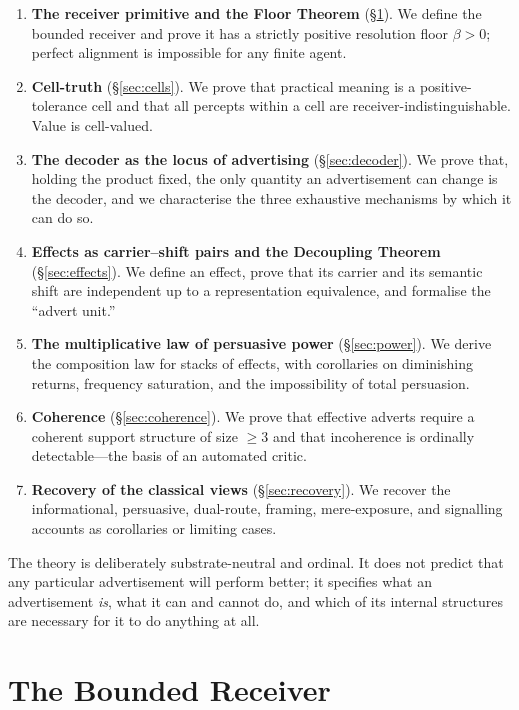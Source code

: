 \documentclass[twocolumn,11pt,a4paper]{article}
\theoremstyle{adv}
\theoremstyle{definition}
\theoremstyle{remark}
\newcommand{\floor}{\beta}            %
\begin{document}
\begin{enumerate}[leftmargin=1.4em,itemsep=2pt]
\item \textbf{The receiver primitive and the Floor Theorem}
  (\S\ref{sec:receiver}). We define the bounded receiver and prove it has
  a strictly positive resolution floor $\floor>0$; perfect alignment is
  impossible for any finite agent.
\item \textbf{Cell-truth} (\S\ref{sec:cells}). We prove that practical
  meaning is a positive-tolerance cell and that all percepts within a cell
  are receiver-indistinguishable. Value is cell-valued.
\item \textbf{The decoder as the locus of advertising}
  (\S\ref{sec:decoder}). We prove that, holding the product fixed, the
  only quantity an advertisement can change is the decoder, and we
  characterise the three exhaustive mechanisms by which it can do so.
\item \textbf{Effects as carrier--shift pairs and the Decoupling Theorem}
  (\S\ref{sec:effects}). We define an effect, prove that its carrier and
  its semantic shift are independent up to a representation equivalence,
  and formalise the ``advert unit.''
\item \textbf{The multiplicative law of persuasive power}
  (\S\ref{sec:power}). We derive the composition law for stacks of
  effects, with corollaries on diminishing returns, frequency saturation,
  and the impossibility of total persuasion.
\item \textbf{Coherence} (\S\ref{sec:coherence}). We prove that effective
  adverts require a coherent support structure of size $\ge 3$ and that
  incoherence is ordinally detectable---the basis of an automated critic.
\item \textbf{Recovery of the classical views} (\S\ref{sec:recovery}).
  We recover the informational, persuasive, dual-route, framing,
  mere-exposure, and signalling accounts as corollaries or limiting cases.
\end{enumerate}

The theory is deliberately substrate-neutral and ordinal. It does not
predict that any particular advertisement will perform better; it
specifies what an advertisement \emph{is}, what it can and cannot do, and
which of its internal structures are necessary for it to do anything at
all.

\section{The Bounded Receiver}
\label{sec:receiver}
\end{document}
